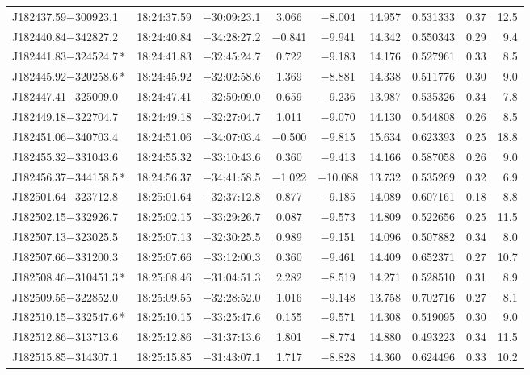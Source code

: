 \begin{table*}
\begin{tabular}{lcccccccr}
J182437.59$-$300923.1 & 18:24:37.59 & $-$30:09:23.1 &  3.066 & $-$8.004 & 14.957 & 0.531333 & 0.37 & 12.5 \\
J182440.84$-$342827.2 & 18:24:40.84 & $-$34:28:27.2 & $-$0.841 & $-$9.941 & 14.342 & 0.550343 & 0.29 & 9.4 \\
J182441.83$-$324524.7\,* & 18:24:41.83 & $-$32:45:24.7 &  0.722 & $-$9.183 & 14.176 & 0.527961 & 0.33 & 8.5 \\
J182445.92$-$320258.6\,* & 18:24:45.92 & $-$32:02:58.6 &  1.369 & $-$8.881 & 14.338 & 0.511776 & 0.30 & 9.0 \\
J182447.41$-$325009.0 & 18:24:47.41 & $-$32:50:09.0 &  0.659 & $-$9.236 & 13.987 & 0.535326 & 0.34 & 7.8 \\
J182449.18$-$322704.7 & 18:24:49.18 & $-$32:27:04.7 &  1.011 & $-$9.070 & 14.130 & 0.544808 & 0.26 & 8.5 \\
J182451.06$-$340703.4 & 18:24:51.06 & $-$34:07:03.4 & $-$0.500 & $-$9.815 & 15.634 & 0.623393 & 0.25 & 18.8 \\
J182455.32$-$331043.6 & 18:24:55.32 & $-$33:10:43.6 &  0.360 & $-$9.413 & 14.166 & 0.587058 & 0.26 & 9.0 \\
J182456.37$-$344158.5\,* & 18:24:56.37 & $-$34:41:58.5 & $-$1.022 & $-$10.088 & 13.732 & 0.535269 & 0.32 & 6.9 \\
J182501.64$-$323712.8 & 18:25:01.64 & $-$32:37:12.8 &  0.877 & $-$9.185 & 14.089 & 0.607161 & 0.18 & 8.8 \\
J182502.15$-$332926.7 & 18:25:02.15 & $-$33:29:26.7 &  0.087 & $-$9.573 & 14.809 & 0.522656 & 0.25 & 11.5 \\
J182507.13$-$323025.5 & 18:25:07.13 & $-$32:30:25.5 &  0.989 & $-$9.151 & 14.096 & 0.507882 & 0.34 & 8.0 \\
J182507.66$-$331200.3 & 18:25:07.66 & $-$33:12:00.3 &  0.360 & $-$9.461 & 14.409 & 0.652371 & 0.27 & 10.7 \\
J182508.46$-$310451.3\,* & 18:25:08.46 & $-$31:04:51.3 &  2.282 & $-$8.519 & 14.271 & 0.528510 & 0.31 & 8.9 \\
J182509.55$-$322852.0 & 18:25:09.55 & $-$32:28:52.0 &  1.016 & $-$9.148 & 13.758 & 0.702716 & 0.27 & 8.1 \\
J182510.15$-$332547.6\,* & 18:25:10.15 & $-$33:25:47.6 &  0.155 & $-$9.571 & 14.308 & 0.519095 & 0.30 & 9.0 \\
J182512.86$-$313713.6 & 18:25:12.86 & $-$31:37:13.6 &  1.801 & $-$8.774 & 14.880 & 0.493223 & 0.34 & 11.5 \\
J182515.85$-$314307.1 & 18:25:15.85 & $-$31:43:07.1 &  1.717 & $-$8.828 & 14.360 & 0.624496 & 0.33 & 10.2 \\

\end{tabular}
\end{table*}
